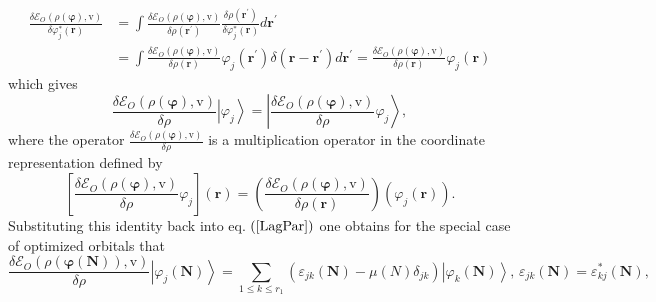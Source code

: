 \documentclass[aps,preprint]{revtex4}%
\begin{document}
\begin{align}
\frac{\delta\mathcal{E}_{O}\left(  \rho\left(  \boldsymbol{\varphi}\right)
\boldsymbol{,}\mathrm{v}\right)  }{\delta\varphi_{j}^{\ast}\left(
\boldsymbol{r}\right)  } &  =\int\frac{\delta\mathcal{E}_{O}\left(
\rho\left(  \boldsymbol{\varphi}\right)  \boldsymbol{,}\mathrm{v}\right)
}{\delta\rho\left(  \boldsymbol{r}^{\prime}\right)  }\frac{\delta\rho\left(
\boldsymbol{r}^{\prime}\right)  }{\delta\varphi_{j}^{\ast}\left(
\boldsymbol{r}\right)  }d\boldsymbol{r}^{\prime}\nonumber\\
&  =\int\frac{\delta\mathcal{E}_{O}\left(  \rho\left(  \boldsymbol{\varphi
}\right)  \boldsymbol{,}\mathrm{v}\right)  }{\delta\rho\left(  \boldsymbol{r}%
\right)  }\varphi_{j}\left(  \boldsymbol{r}^{\prime}\right)  \delta\left(
\boldsymbol{r-r}^{\prime}\right)  d\boldsymbol{r}^{\prime}=\frac
{\delta\mathcal{E}_{O}\left(  \rho\left(  \boldsymbol{\varphi}\right)
\boldsymbol{,}\mathrm{v}\right)  }{\delta\rho\left(  \boldsymbol{r}\right)
}\varphi_{j}\left(  \boldsymbol{r}\right)
\end{align}
which gives
\begin{equation}
\frac{\delta\mathcal{E}_{O}\left(  \rho\left(  \boldsymbol{\varphi}\right)
\boldsymbol{,}\mathrm{v}\right)  }{\delta\rho}\left\vert \varphi
_{j}\right\rangle =\left\vert \frac{\delta\mathcal{E}_{O}\left(  \rho\left(
\boldsymbol{\varphi}\right)  \boldsymbol{,}\mathrm{v}\right)  }{\delta\rho
}\varphi_{j}\right\rangle ,
\end{equation}
where the operator $\frac{\delta\mathcal{E}_{O}\left(  \rho\left(
\boldsymbol{\varphi}\right)  \boldsymbol{,}\mathrm{v}\right)  }{\delta\rho}$
is a multiplication operator in the coordinate representation defined by
\begin{equation}
\left[  \frac{\delta\mathcal{E}_{O}\left(  \rho\left(  \boldsymbol{\varphi
}\right)  \boldsymbol{,}\mathrm{v}\right)  }{\delta\rho}\varphi_{j}\right]
\left(  \boldsymbol{r}\right)  =\left(  \frac{\delta\mathcal{E}_{O}\left(
\rho\left(  \boldsymbol{\varphi}\right)  \boldsymbol{,}\mathrm{v}\right)
}{\delta\rho\left(  \boldsymbol{r}\right)  }\right)  \left(  \varphi
_{j}\left(  \boldsymbol{r}\right)  \right)  .
\end{equation}
Substituting this identity back into eq. $\left(  \ref{LagPar}\right)  $ one
obtains for the special case of optimized orbitals that%
\begin{equation}
\frac{\delta\mathcal{E}_{O}\left(  \rho\left(  \boldsymbol{\varphi\left(
\boldsymbol{N}\right)  }\right)  \boldsymbol{,}\mathrm{v}\right)  }{\delta
\rho}\left\vert \varphi_{j}\left(  \boldsymbol{N}\right)  \right\rangle
=\sum_{1\leq k\leq r_{1}}\left(  \varepsilon_{jk}\left(  \boldsymbol{N}%
\right)  -\mu\left(  N\right)  \delta_{jk}\right)  \left\vert \varphi
_{k}\left(  \boldsymbol{N}\right)  \right\rangle ,\,\varepsilon_{jk}\left(
\boldsymbol{N}\right)  =\varepsilon_{kj}^{\ast}\left(  \boldsymbol{N}\right)
,\label{FockEq}%
\end{equation}
\end{document}
